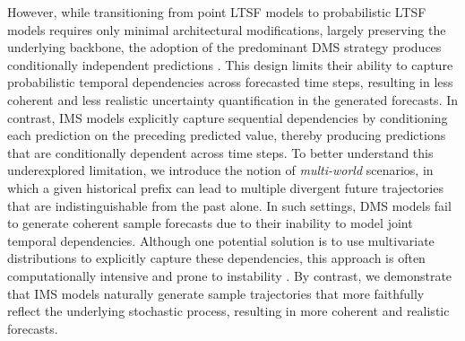 \documentclass[a4paper,oneside,bibliography=totoc]{scrbook}
\begin{document}
\noindent
However, while transitioning from point LTSF models to probabilistic LTSF models requires only minimal architectural modifications, largely preserving the underlying backbone, the adoption of the predominant DMS strategy produces conditionally independent predictions \cite{taieb_recursive_2012}. 
This design limits their ability to capture probabilistic temporal dependencies across forecasted time steps, resulting in less coherent and less realistic uncertainty quantification in the generated forecasts. 
In contrast, IMS models explicitly capture sequential dependencies by conditioning each prediction on the preceding predicted value, thereby producing predictions that are conditionally dependent across time steps.
To better understand this underexplored limitation, we introduce the notion of \textit{ multi-world} scenarios, in which a given historical prefix can lead to multiple divergent future trajectories that are indistinguishable from the past alone. 
In such settings, DMS models fail to generate coherent sample forecasts due to their inability to model joint temporal dependencies. 
Although one potential solution is to use multivariate distributions to explicitly capture these dependencies, this approach is often computationally intensive and prone to instability \cite{salinas_high-dimensional_2019, wu_dynamic_2013}.
By contrast, we demonstrate that IMS models naturally generate sample trajectories that more faithfully reflect the underlying stochastic process, resulting in more coherent and realistic forecasts.
\end{document}

